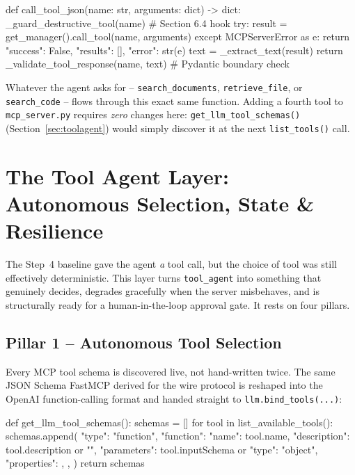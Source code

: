 \documentclass[11pt,a4paper]{article}
\begin{document}
\begin{pycode}
def call_tool_json(name: str, arguments: dict) -> dict:
    _guard_destructive_tool(name)          # Section 6.4 hook
    try:
        result = get_manager().call_tool(name, arguments)
    except MCPServerError as e:
        return {"success": False, "results": [], "error": str(e)}
    text = _extract_text(result)
    return _validate_tool_response(name, text)   # Pydantic boundary check
\end{pycode}

Whatever the agent asks for -- \texttt{search\_documents},
\texttt{retrieve\_file}, or \texttt{search\_code} -- flows through this
exact same function. Adding a fourth tool to \texttt{mcp\_server.py}
requires \emph{zero} changes here: \texttt{get\_llm\_tool\_schemas()}
(Section~\ref{sec:toolagent}) would simply discover it at the next
\texttt{list\_tools()} call.


\section{The Tool Agent Layer: Autonomous Selection, State \& Resilience}
\label{sec:toolagentdeep}

The Step~4 baseline gave the agent \emph{a} tool call, but the choice of
tool was still effectively deterministic. This layer turns
\texttt{tool\_agent} into something that genuinely decides, degrades
gracefully when the server misbehaves, and is structurally ready for a
human-in-the-loop approval gate. It rests on four pillars.

\subsection{Pillar 1 -- Autonomous Tool Selection}

Every MCP tool schema is discovered live, not hand-written twice. The
same JSON Schema FastMCP derived for the wire protocol is reshaped into
the OpenAI function-calling format and handed straight to
\texttt{llm.bind\_tools(...)}:

\begin{pycode}
def get_llm_tool_schemas():
    schemas = []
    for tool in list_available_tools():
        schemas.append({
            "type": "function",
            "function": {
                "name": tool.name,
                "description": tool.description or "",
                "parameters": tool.inputSchema or {"type": "object", "properties": {}},
            },
        })
    return schemas
\end{pycode}
\end{document}
